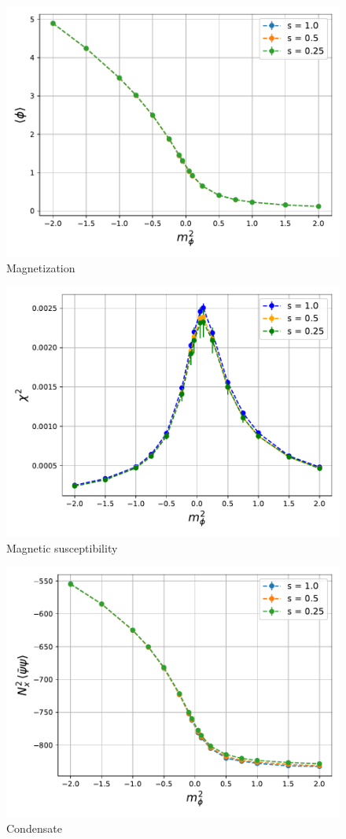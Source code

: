 \begin{figure}[h]
    \centering
    \includegraphics[scale=0.7]{figures/phase_trans/phi.pdf}
    \caption{Magnetization}
    \label{fig:enter-label}
\end{figure}

\begin{figure}[h]
    \centering
    \includegraphics[scale=0.7]{figures/phase_trans/chi2.pdf}
    \caption{Magnetic susceptibility}
    \label{fig:enter-label}
\end{figure}

\begin{figure}[h]
    \centering
    \includegraphics[scale=0.7]{figures/phase_trans/condensate.pdf}
    \caption{Condensate}
    \label{fig:enter-label}
\end{figure}